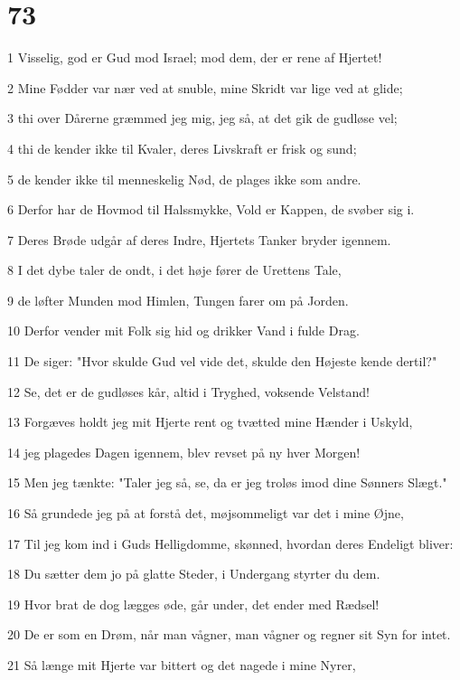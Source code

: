\chapter{73}

\par 1 Visselig, god er Gud mod Israel; mod dem, der er rene af Hjertet!
\par 2 Mine Fødder var nær ved at snuble, mine Skridt var lige ved at glide;
\par 3 thi over Dårerne græmmed jeg mig, jeg så, at det gik de gudløse vel;
\par 4 thi de kender ikke til Kvaler, deres Livskraft er frisk og sund;
\par 5 de kender ikke til menneskelig Nød, de plages ikke som andre.
\par 6 Derfor har de Hovmod til Halssmykke, Vold er Kappen, de svøber sig i.
\par 7 Deres Brøde udgår af deres Indre, Hjertets Tanker bryder igennem.
\par 8 I det dybe taler de ondt, i det høje fører de Urettens Tale,
\par 9 de løfter Munden mod Himlen, Tungen farer om på Jorden.
\par 10 Derfor vender mit Folk sig hid og drikker Vand i fulde Drag.
\par 11 De siger: "Hvor skulde Gud vel vide det, skulde den Højeste kende dertil?"
\par 12 Se, det er de gudløses kår, altid i Tryghed, voksende Velstand!
\par 13 Forgæves holdt jeg mit Hjerte rent og tvætted mine Hænder i Uskyld,
\par 14 jeg plagedes Dagen igennem, blev revset på ny hver Morgen!
\par 15 Men jeg tænkte: "Taler jeg så, se, da er jeg troløs imod dine Sønners Slægt."
\par 16 Så grundede jeg på at forstå det, møjsommeligt var det i mine Øjne,
\par 17 Til jeg kom ind i Guds Helligdomme, skønned, hvordan deres Endeligt bliver:
\par 18 Du sætter dem jo på glatte Steder, i Undergang styrter du dem.
\par 19 Hvor brat de dog lægges øde, går under, det ender med Rædsel!
\par 20 De er som en Drøm, når man vågner, man vågner og regner sit Syn for intet.
\par 21 Så længe mit Hjerte var bittert og det nagede i mine Nyrer,
